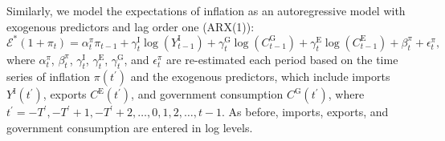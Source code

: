 Similarly, we model the expectations of inflation as an autoregressive model with exogenous predictors and lag order one (ARX(1)): 
\begin{equation}
	\mathcal{E}^*(1+\pi_t)= \alpha^{\pi}_{t} \pi_{t-1} + \gamma^{\mathrm{I}}_{t}\log(Y^{\mathrm{I}}_{t-1}) + \gamma^{\mathrm{G}}_{t}\log(C^{\mathrm{G}}_{t-1}) + \gamma^{\mathrm{E}}_{t}\log(C^{\mathrm{E}}_{t-1}) + \beta^{\pi}_{t} + \epsilon^{\pi}_{t},
	\label{eq:inflationarx}
\end{equation}
where \(\alpha^{\pi}_{t}\), \(\beta^{\pi}_{t}\), \(\gamma^{\mathrm{I}}_{t}\), \(\gamma^{\mathrm{E}}_{t}\), \(\gamma^{\mathrm{G}}_{t}\), and \(\epsilon^{\pi}_{t}\) are re-estimated each period based on the time series of inflation \(\pi(t^{\prime})\) and the exogenous predictors, which include imports \(Y^{\mathrm{I}}(t^{\prime})\), exports \(C^{\mathrm{E}}(t^{\prime})\), and government consumption \(C^{\mathrm{G}}(t^{\prime})\), where \(t^{\prime} = -T^{\prime}, -T^{\prime}+1, -T^{\prime}+2, \dots, 0, 1, 2, \dots, t-1\). As before, imports, exports, and government consumption are entered in log levels.
